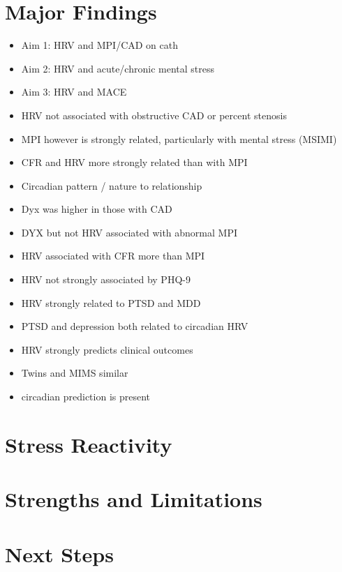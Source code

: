 \documentclass[
  11pt,
  openany]{book}
\begin{document}
\hypertarget{major-findings}{%
\chapter{Major Findings}\label{major-findings}}

\begin{itemize}
\item
  Aim 1: HRV and MPI/CAD on cath
\item
  Aim 2: HRV and acute/chronic mental stress
\item
  Aim 3: HRV and MACE
\item
  HRV not associated with obstructive CAD or percent stenosis
\item
  MPI however is strongly related, particularly with mental stress (MSIMI)
\item
  CFR and HRV more strongly related than with MPI
\item
  Circadian pattern / nature to relationship
\item
  Dyx was higher in those with CAD
\item
  DYX but not HRV associated with abnormal MPI
\item
  HRV associated with CFR more than MPI
\item
  HRV not strongly associated by PHQ-9
\item
  HRV strongly related to PTSD and MDD
\item
  PTSD and depression both related to circadian HRV
\item
  HRV strongly predicts clinical outcomes
\item
  Twins and MIMS similar
\item
  circadian prediction is present
\end{itemize}

\hypertarget{stress-reactivity}{%
\chapter{Stress Reactivity}\label{stress-reactivity}}

\hypertarget{strengths-and-limitations}{%
\chapter{Strengths and Limitations}\label{strengths-and-limitations}}

\hypertarget{next-steps}{%
\chapter{Next Steps}\label{next-steps}}
\end{document}
